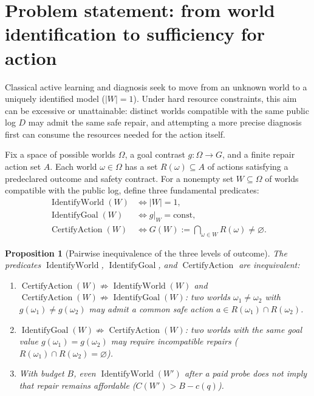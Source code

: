 \documentclass[11pt,a4paper]{article}
\theoremstyle{preprintthm}
\newtheorem{proposition}[theorem]{Proposition}
\theoremstyle{preprintdef}
\begin{document}
\section{Problem statement: from world identification to sufficiency for action}

Classical active learning and diagnosis seek to move from an unknown world to a uniquely identified model ($|W|=1$). Under hard resource constraints, this aim can be excessive or unattainable: distinct worlds compatible with the same public log $D$ may admit the same safe repair, and attempting a more precise diagnosis first can consume the resources needed for the action itself.

\begin{samepage}
Fix a space of possible worlds $\Omega$, a goal contrast $g:\Omega\to G$, and a finite repair action set $A$. Each world $\omega\in\Omega$ has a set $R(\omega)\subseteq A$ of actions satisfying a predeclared outcome and safety contract. For a nonempty set $W\subseteq\Omega$ of worlds compatible with the public log, define three fundamental predicates:
\begin{equation}
  \begin{aligned}
    \operatorname{IdentifyWorld}(W) &\iff |W|=1,\\
    \operatorname{IdentifyGoal}(W)  &\iff g|_W = \mathrm{const},\\
    \operatorname{CertifyAction}(W) &\iff G(W) := \bigcap_{\omega\in W} R(\omega) \ne \varnothing.
  \end{aligned}
\end{equation}
\end{samepage}

\begin{proposition}[Pairwise inequivalence of the three levels of outcome]
\label{prop:three_levels}
The predicates $\operatorname{IdentifyWorld}$, $\operatorname{IdentifyGoal}$, and $\operatorname{CertifyAction}$ are inequivalent:
\begin{enumerate}
  \item $\operatorname{CertifyAction}(W)\not\Rightarrow\operatorname{IdentifyWorld}(W)$ and $\operatorname{CertifyAction}(W)\not\Rightarrow\operatorname{IdentifyGoal}(W)$: two worlds $\omega_1\ne\omega_2$ with $g(\omega_1)\ne g(\omega_2)$ may admit a common safe action $a\in R(\omega_1)\cap R(\omega_2)$.
  \item $\operatorname{IdentifyGoal}(W)\not\Rightarrow\operatorname{CertifyAction}(W)$: two worlds with the same goal value $g(\omega_1)=g(\omega_2)$ may require incompatible repairs ($R(\omega_1)\cap R(\omega_2)=\varnothing$).
  \item With budget $B$, even $\operatorname{IdentifyWorld}(W')$ after a paid probe does not imply that repair remains affordable ($C(W')>B-c(q)$).
\end{enumerate}
\end{proposition}
\end{document}

